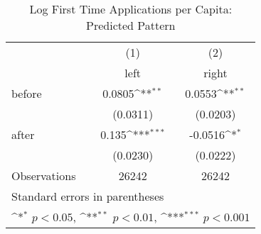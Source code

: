 \begin{table}[htbp]\centering
\def\sym#1{\ifmmode^{#1}\else\(^{#1}\)\fi}
\caption{Log First Time Applications per Capita: Predicted Pattern}
\begin{tabular}{l*{2}{c}}
\hline\hline
                    &\multicolumn{1}{c}{(1)}&\multicolumn{1}{c}{(2)}\\
                    &\multicolumn{1}{c}{left}&\multicolumn{1}{c}{right}\\
\hline
before              &      0.0805\sym{**} &      0.0553\sym{**} \\
                    &    (0.0311)         &    (0.0203)         \\
[1em]
after               &       0.135\sym{***}&     -0.0516\sym{*}  \\
                    &    (0.0230)         &    (0.0222)         \\
\hline
Observations        &       26242         &       26242         \\
\hline\hline
\multicolumn{3}{l}{\footnotesize Standard errors in parentheses}\\
\multicolumn{3}{l}{\footnotesize \sym{*} \(p<0.05\), \sym{**} \(p<0.01\), \sym{***} \(p<0.001\)}\\
\end{tabular}
\end{table}
